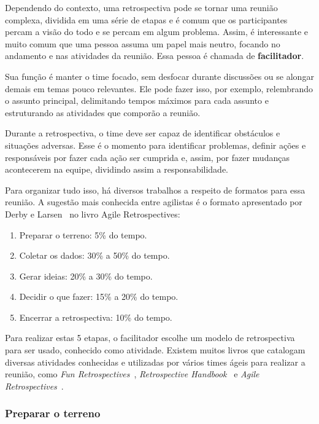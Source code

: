 Dependendo do contexto, uma retrospectiva pode se tornar uma reunião complexa, dividida em uma série de etapas e é comum que os participantes percam a visão do todo e se percam em algum problema. Assim, é interessante e muito comum que uma pessoa assuma um papel mais neutro, focando no andamento e nas atividades da reunião. Essa pessoa é chamada de \textbf{facilitador}.

Sua função é manter o time focado, sem desfocar durante discussões ou se alongar demais em temas pouco relevantes. Ele pode fazer isso, por exemplo, relembrando o assunto principal, delimitando tempos máximos para cada assunto e estruturando as atividades que comporão a reunião.

Durante a retrospectiva, o time deve ser capaz de identificar obstáculos e situações adversas. Esse é o momento para identificar problemas, definir ações e responsáveis por fazer cada ação ser cumprida e, 	assim, por fazer mudanças acontecerem na equipe, dividindo assim a responsabilidade.

Para organizar tudo isso, há diversos trabalhos a respeito de formatos para essa reunião. A sugestão mais conhecida entre agilistas é o formato apresentado por Derby e Larsen~\cite{retrospectives} no livro Agile Retrospectives: 

\begin{enumerate}
	\item Preparar o terreno: 5\% do tempo.
	\item Coletar os dados: 30\% a 50\% do tempo.
	\item Gerar ideias: 20\% a 30\% do tempo.
	\item Decidir o que fazer: 15\% a 20\% do tempo.
	\item Encerrar a retrospectiva: 10\% do tempo.
\end{enumerate}

Para realizar estas 5 etapas, o facilitador escolhe um modelo de retrospectiva para ser usado, conhecido como atividade. Existem muitos livros que catalogam diversas atividades conhecidas e utilizadas por vários times ágeis para realizar a reunião, como \textit{Fun Retrospectives}~\cite{funRetrospectives}, \textit{Retrospective Handbook}~\cite{handRetrospectives} e \textit{Agile Retrospectives}~\cite{retrospectives}.

\subsubsection*{Preparar o terreno}

